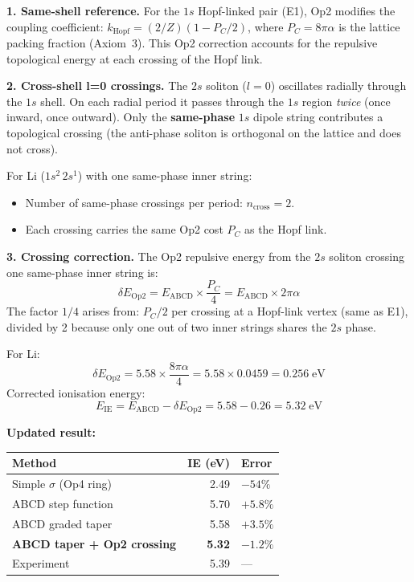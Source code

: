 \noindent\textbf{1. Same-shell reference.}
For the $1s$ Hopf-linked pair (E1), Op2
modifies the coupling coefficient:
$k_{\text{Hopf}} = (2/Z)(1 - P_C/2)$,
where $P_C = 8\pi\alpha$ is the lattice
packing fraction (Axiom~3).  This Op2
correction accounts for the repulsive
topological energy at each crossing of the
Hopf link.

\noindent\textbf{2. Cross-shell l=0 crossings.}
The $2s$ soliton ($l{=}0$) oscillates radially
through the $1s$ shell.  On each radial period
it passes through the $1s$ region \emph{twice}
(once inward, once outward).  Only the
\textbf{same-phase} $1s$ dipole string contributes
a topological crossing (the anti-phase
soliton is orthogonal on the lattice and
does not cross).

For Li ($1s^2\,2s^1$) with one same-phase
inner string:
\begin{itemize}
    \item Number of same-phase crossings
          per period: $n_{\text{cross}} = 2$.
    \item Each crossing carries the same
          Op2 cost $P_C$ as the Hopf link.
\end{itemize}

\noindent\textbf{3. Crossing correction.}
The Op2 repulsive energy from the $2s$
soliton crossing one same-phase inner string
is:
\begin{equation}
    \delta E_{\text{Op2}} =
    E_{\text{ABCD}} \times
    \frac{P_C}{4}
    = E_{\text{ABCD}} \times 2\pi\alpha
    \label{eq:op2_cross_shell}
\end{equation}
The factor $1/4$ arises from:
$P_C/2$ per crossing at a Hopf-link vertex
(same as E1), divided by 2 because only one
out of two inner strings shares the $2s$
phase.

For Li:
\begin{equation}
    \delta E_{\text{Op2}} = 5.58 \times
    \frac{8\pi\alpha}{4}
    = 5.58 \times 0.0459
    = 0.256\;\text{eV}
\end{equation}
Corrected ionisation energy:
\begin{equation}
    E_{\text{IE}} = E_{\text{ABCD}} -
    \delta E_{\text{Op2}}
    = 5.58 - 0.26 = 5.32\;\text{eV}
\end{equation}

\noindent\textbf{Updated result:}
\begin{center}
\small
\renewcommand{\arraystretch}{1.2}
\begin{tabular}{lrl}
\hline
\textbf{Method} & \textbf{IE (eV)}
& \textbf{Error} \\
\hline
Simple $\sigma$ (Op4 ring)
    & 2.49 & $-54\%$ \\
ABCD step function
    & 5.70 & $+5.8\%$ \\
ABCD graded taper
    & 5.58 & $+3.5\%$ \\
\textbf{ABCD taper + Op2 crossing}
    & \textbf{5.32} & $\mathbf{-1.2\%}$ \\
Experiment
    & 5.39 & --- \\
\hline
\end{tabular}
\end{center}

